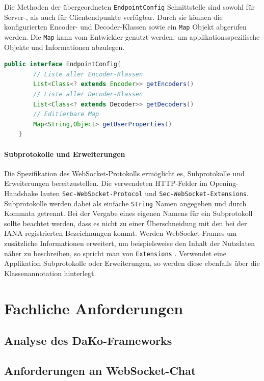\documentclass[11pt,a4paper,titlepage]{scrartcl}
\numberwithin{equation}{section}
\begin{document}
\noindent Die Methoden der übergeordneten \texttt{EndpointConfig} Schnittstelle sind sowohl für Server-, als auch für Clientendpunkte verfügbar. Durch sie können die konfigurierten Encoder- und Decoder-Klassen sowie ein \texttt{Map} Objekt abgerufen werden. Die \texttt{Map} kann vom Entwickler genutzt werden, um applikationsspezifische Objekte und Informationen abzulegen. \medskip

\begin{lstlisting}[frame=single, language=Java, caption=Java: EndpointConfig]
	public interface EndpointConfig{
		// Liste aller Encoder-Klassen
		List<Class<? extends Encoder>> getEncoders()
		// Liste aller Decoder-Klassen
		List<Class<? extends Decoder>> getDecoders()
		// Editierbare Map
		Map<String,Object> getUserProperties()
	}
\end{lstlisting}

\paragraph{Subprotokolle und Erweiterungen}
Die Spezifikation des WebSocket-Protokolls ermöglicht es, Subprotokolle und Erweiterungen bereitzustellen. Die verwendeten HTTP-Felder im Opening-Handshake lauten \texttt{Sec-WebSocket-Protocol} und \texttt{Sec-WebSocket-Extensions}. Subprotokolle werden dabei als einfache \texttt{String} Namen angegeben und durch Kommata getrennt. Bei der Vergabe eines eigenen Namens für ein Subprotokoll sollte beachtet werden, dass es nicht zu einer Überschneidung mit den bei der IANA registrierten Bezeichnungen kommt. Werden WebSocket-Frames um zusätzliche Informationen erweitert, um beispielsweise den Inhalt der Nutzdaten näher zu beschreiben, so spricht man von \texttt{Extensions} \autocite[102]{coward_java_2014}. Verwendet eine Applikation Subprotokolle oder Erweiterungen, so werden diese ebenfalls über die Klassenannotation hinterlegt.\\

\noindent 
\newpage
\section{Fachliche Anforderungen}
\subsection{Analyse des DaKo-Frameworks}
\subsection{Anforderungen an WebSocket-Chat}
\end{document}
